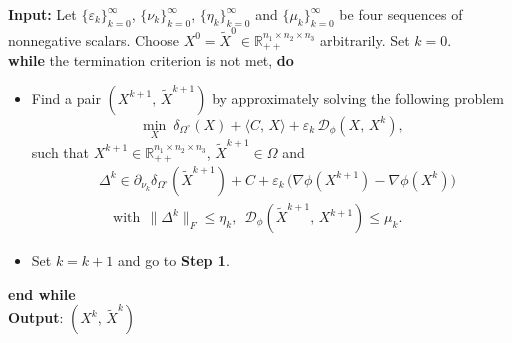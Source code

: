 \documentclass[10pt]{article}
\begin{document}
\begin{algorithm}[h]
\caption{An implementable inexact entropic proximal point algorithm (iEPPA) for solving \eqref{cmotproblem3dre}}\label{algEPPA}
\textbf{Input:} Let $\{\varepsilon_k\}_{k=0}^{\infty}$, $\{\nu_k\}_{k=0}^{\infty}$, $\{\eta_k\}_{k=0}^{\infty}$ and $\{\mu_k\}_{k=0}^{\infty}$ be four sequences of nonnegative scalars. Choose $X^0=\widetilde{X}^{0}\in\mathbb{R}_{++}^{n_1 \times n_2 \times n_3}$ arbitrarily. Set $k=0$.  \\
\textbf{while} the termination criterion is not met, \textbf{do} \vspace{-2mm}
\begin{itemize}[leftmargin=2cm]
\item[\textbf{Step 1}.]
    Find a pair $(X^{k+1},\,\widetilde{X}^{k+1})$ by approximately solving the following problem
    \begin{equation}\label{EPPAsubpro}
    \min\limits_{X}~
    \delta_{\Omega^{\circ}}(X) + \langle C, \,X\rangle + \varepsilon_k\,\mathcal{D}_{\phi}(X, \,X^k),
    \end{equation}
    such that $X^{k+1}\in\mathbb{R}_{++}^{n_1 \times n_2 \times n_3}$, $\widetilde{X}^{k+1}\in\Omega$ and
    \begin{equation}\label{EPPAcond1}
    \begin{aligned}
    &\Delta^{k} \in \partial_{\nu_k} \delta_{\Omega^{\circ}}(\widetilde{X}^{k+1}) + C + \varepsilon_k\,\big(\nabla\phi(X^{k+1}) - \nabla\phi(X^{k})\big) \\
    &\quad \mathrm{with}~~\|\Delta^{k}\|_F \leq \eta_k, ~~\mathcal{D}_{\phi}(\widetilde{X}^{k+1}, \,X^{k+1}) \leq \mu_k.
    \end{aligned}
    \end{equation}

\item [\textbf{Step 2}.] Set $k = k+1$ and go to \textbf{Step 1}. \vspace{-1.5mm}
\end{itemize}
\textbf{end while}  \\
\textbf{Output}: $(X^{k},\,\widetilde{X}^{k})$ \vspace{0.5mm}
\end{algorithm}
\end{document}
